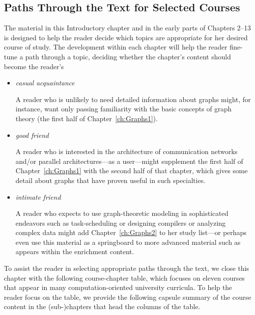\subsection{Paths Through the Text for Selected Courses}

The material in this Introductory chapter and in the early parts of Chapters 2--13 is designed to help the reader decide which topics are appropriate for her desired course of study.  The development within each chapter will help the reader fine-tune a path through a topic, deciding whether the chapter's content should become the reader's
\begin{itemize}
\item
{\em casual acquaintance}

\smallskip

A reader who is unlikely to need detailed information about graphs might, for instance, want only passing familiarity with the basic concepts of graph theory (the first half of Chapter~\ref{ch:Graphs1}).

\medskip\item
{\em good friend}

\smallskip

A reader who is interested in the architecture of communication networks and/or parallel architectures---as a user---might supplement the first half of Chapter~\ref{ch:Graphs1} with the second half of that chapter, which gives some detail about graphs that have proven useful in such specialties.

\medskip\item
{\em intimate friend}

\smallskip

A reader who expects to use graph-theoretic modeling in sophisticated endeavors such as 
task-scheduling or designing compilers or analyzing complex data might add Chapter~\ref{ch:Graphs2} to her study list---or perhaps even use this material as a springboard to more advanced material such as appears within the enrichment content.
\end{itemize}

\bigskip

To assist the reader in selecting appropriate paths through the text, we close this chapter with the following course-chapter table, which focuses on eleven courses that appear in many computation-oriented university curricula.  To help the reader focus on the table, we provide the following capsule summary of the course content in the (sub-)chapters that head the columns of the table.

